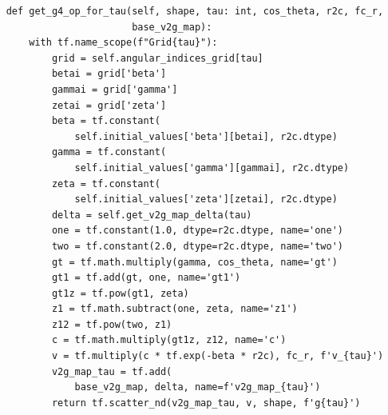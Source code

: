 \documentclass[final,1p,times]{elsarticle}
\begin{document}
\begin{verbatim}
    def get_g4_op_for_tau(self, shape, tau: int, cos_theta, r2c, fc_r,
                          base_v2g_map):
        with tf.name_scope(f"Grid{tau}"):
            grid = self.angular_indices_grid[tau]
            betai = grid['beta']
            gammai = grid['gamma']
            zetai = grid['zeta']
            beta = tf.constant(
                self.initial_values['beta'][betai], r2c.dtype)
            gamma = tf.constant(
                self.initial_values['gamma'][gammai], r2c.dtype)
            zeta = tf.constant(
                self.initial_values['zeta'][zetai], r2c.dtype)
            delta = self.get_v2g_map_delta(tau)
            one = tf.constant(1.0, dtype=r2c.dtype, name='one')
            two = tf.constant(2.0, dtype=r2c.dtype, name='two')
            gt = tf.math.multiply(gamma, cos_theta, name='gt')
            gt1 = tf.add(gt, one, name='gt1')
            gt1z = tf.pow(gt1, zeta)
            z1 = tf.math.subtract(one, zeta, name='z1')
            z12 = tf.pow(two, z1)
            c = tf.math.multiply(gt1z, z12, name='c')
            v = tf.multiply(c * tf.exp(-beta * r2c), fc_r, f'v_{tau}')
            v2g_map_tau = tf.add(
                base_v2g_map, delta, name=f'v2g_map_{tau}')
            return tf.scatter_nd(v2g_map_tau, v, shape, f'g{tau}')


\end{verbatim}
\end{document}

